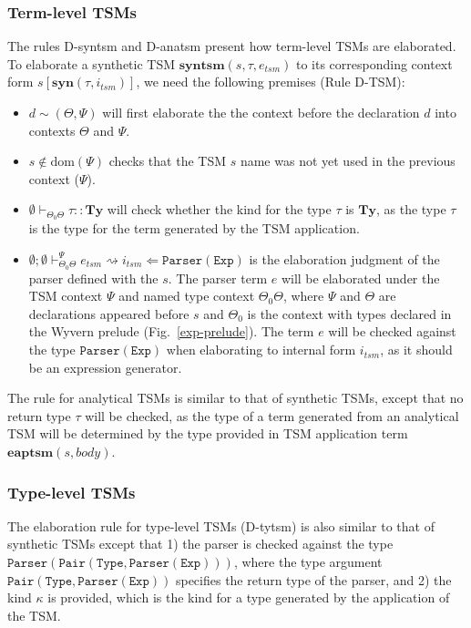 \subsubsection{Term-level TSMs}
The rules D-syntsm and D-anatsm present how term-level TSMs are elaborated. To elaborate a synthetic TSM $\mathbf{syntsm}(s,\tau,e_{tsm})$ to its corresponding context form $s[\mathbf{syn}(\tau,i_{tsm})]$, we need the following premises (Rule D-TSM):
\begin{itemize}\itemsep0pt
\item $d\sim(\Theta,\Psi)$ will first elaborate the the context before the declaration $d$ into contexts $\Theta$ and $\Psi$.
\item $s\notin\text{dom}(\Psi)$ checks that the TSM $s$ name was not yet used in the previous context ($\Psi$).
\item $\emptyset\vdash_{\Theta_0\Theta}\tau::\mathbf{Ty}$ will check whether the kind for the type $\tau$ is $\mathbf{Ty}$, as the type $\tau$ is the type for the term generated by the TSM application.
\item $\emptyset;\emptyset\vdash_{\Theta_0\Theta}^{\Psi}e_{tsm}\rightsquigarrow i_{tsm} \Leftarrow \mathtt{Parser(Exp)}$ is the elaboration judgment of the parser defined with the $s$. The parser term $e$ will be elaborated under the TSM context $\Psi$ and named type context $\Theta_0\Theta$, where $\Psi$ and $\Theta$ are declarations appeared before $s$ and $\Theta_0$ is the context with types declared in the Wyvern prelude (Fig.~\ref{exp-prelude}). The term $e$ will be checked against the type $\mathtt{Parser(Exp)}$ when elaborating to internal form $i_{tsm}$, as it should be an expression generator.
\end{itemize}

The rule for analytical TSMs is similar to that of synthetic TSMs, except that no return type $\tau$ will be checked, as the type of a term generated from an analytical TSM will be determined by the type provided in TSM application term $\mathbf{eaptsm}(s,body)$.

\subsubsection{Type-level TSMs}
The elaboration rule for type-level TSMs (D-tytsm) is also similar to that of synthetic TSMs except that 1) the parser is checked against the type $\mathtt{Parser(Pair(Type,Parser(Exp)))}$, where the type argument $\mathtt{Pair(Type,Parser(Exp))}$ specifies the return type of the parser, and 2) the kind $\kappa$ is provided, which is the kind for a type generated by the application of the TSM.

